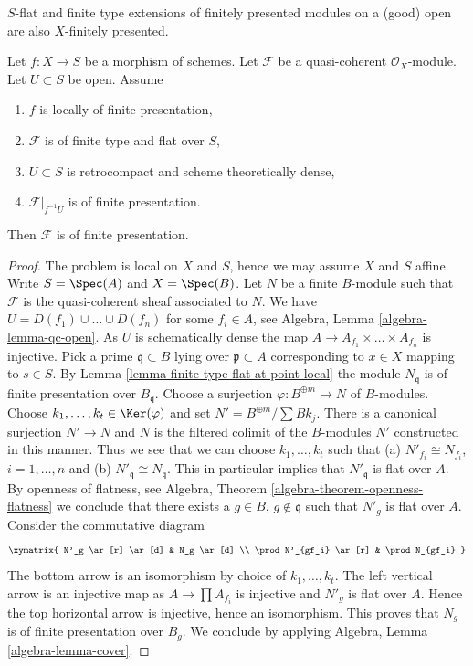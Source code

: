\begin{lemma}
\label{lemma-flat-finite-type-finitely-presented-over-dense-open}
\begin{slogan}
$S$-flat and finite type extensions of finitely presented modules
on a (good) open are also $X$-finitely presented.
\end{slogan}
Let $f : X \to S$ be a morphism of schemes. Let $\mathcal{F}$ be a
quasi-coherent $\mathcal{O}_X$-module. Let $U \subset S$ be open.
Assume
\begin{enumerate}
\item $f$ is locally of finite presentation,
\item $\mathcal{F}$ is of finite type and flat over $S$,
\item $U \subset S$ is retrocompact and scheme theoretically dense,
\item $\mathcal{F}|_{f^{-1}U}$ is of finite presentation.
\end{enumerate}
Then $\mathcal{F}$ is of finite presentation.
\end{lemma}

\begin{proof}
The problem is local on $X$ and $S$, hence we may assume $X$ and $S$ affine.
Write $S = \Spec(A)$ and $X = \Spec(B)$. Let $N$ be a finite $B$-module such
that $\mathcal{F}$ is the quasi-coherent sheaf associated to $N$.
We have $U = D(f_1) \cup \ldots \cup D(f_n)$ for some $f_i \in A$, see
Algebra, Lemma \ref{algebra-lemma-qc-open}.
As $U$ is schematically dense the map
$A \to A_{f_1} \times \ldots \times A_{f_n}$ is injective.
Pick a prime $\mathfrak q \subset B$ lying over $\mathfrak p \subset A$
corresponding to $x \in X$ mapping to $s \in S$.
By Lemma \ref{lemma-finite-type-flat-at-point-local}
the module $N_\mathfrak q$ is of finite presentation over $B_\mathfrak q$.
Choose a surjection $\varphi : B^{\oplus m} \to N$ of $B$-modules.
Choose $k_1, \ldots, k_t \in \Ker(\varphi)$ and
set $N' = B^{\oplus m}/\sum Bk_j$. There is a canonical surjection
$N' \to N$ and $N$ is the filtered colimit of the $B$-modules $N'$
constructed in this manner. Thus we see that we can choose
$k_1, \ldots, k_t$ such that (a) $N'_{f_i} \cong N_{f_i}$, $i = 1, \ldots, n$
and (b) $N'_\mathfrak q \cong N_\mathfrak q$.
This in particular implies that $N'_\mathfrak q$ is flat over $A$.
By openness of flatness, see
Algebra, Theorem \ref{algebra-theorem-openness-flatness}
we conclude that there exists a $g \in B$, $g \not \in \mathfrak q$
such that $N'_g$ is flat over $A$. Consider the commutative diagram
$$
\xymatrix{
N'_g \ar[r] \ar[d] & N_g \ar[d] \\
\prod N'_{gf_i} \ar[r] & \prod N_{gf_i}
}
$$
The bottom arrow is an isomorphism by choice of $k_1, \ldots, k_t$.
The left vertical arrow is an injective map as
$A \to \prod A_{f_i}$ is injective and $N'_g$ is flat over $A$.
Hence the top horizontal arrow is injective, hence an isomorphism.
This proves that $N_g$ is of finite presentation over $B_g$.
We conclude by applying
Algebra, Lemma \ref{algebra-lemma-cover}.
\end{proof}
